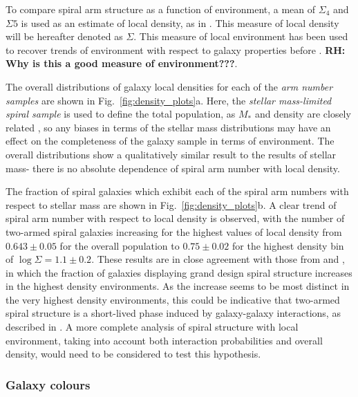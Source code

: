 \documentclass[useAMS,usenatbib]{mn2e}
\newcommand{\rh}[1]{{\bf \textcolor{RoyalPurple}{RH: #1}}}
\begin{document}
To compare spiral arm structure as a function of environment, a mean of $\Sigma_4$ and $\Sigma5$ is used as an estimate of local density, as in \citealt{Baldry_06}. This measure of local density will be hereafter denoted as $\Sigma$. This measure of local environment has been used to recover trends of environment with respect to galaxy properties before \citep{Baldry_06,Bamford_09}. \rh{Why is this a good measure of environment???}.

The overall distributions of galaxy local densities for each of the \textit{arm number samples} are shown in Fig.~\ref{fig:density_plots}a. Here, the \textit{stellar mass-limited spiral sample} is used to define the total population, as $M_*$ and density are closely related \citep{Baldry_06}, so any biases in terms of the stellar mass distributions may have an effect on the completeness of the galaxy sample in terms of environment. The overall distributions show a qualitatively similar result to the results of stellar mass- there is no absolute dependence of spiral arm number with local density. 

The fraction of spiral galaxies which exhibit each of the spiral arm numbers with respect to stellar mass are shown in Fig.~\ref{fig:density_plots}b. A clear trend of spiral arm number with respect to local density is observed, with the number of two-armed spiral galaxies increasing for the highest values of local density from $0.643 \pm 0.05$ for the overall population to $0.75 \pm 0.02$ for the highest density bin of $\log \Sigma = 1.1 \pm 0.2$. These results are in close agreement with those from \citealt{EE_82} and \citealt{Ann_14}, in which the fraction of galaxies displaying grand design spiral structure increases in the highest density environments. As the increase seems to be most distinct in the very highest density environments, this could be indicative that two-armed spiral structure is a  short-lived phase induced by galaxy-galaxy interactions, as described in \citealt{EE_86}. A more complete analysis of spiral structure with local environment, taking into account both interaction probabilities and overall density, would need to be considered to test this hypothesis.


\subsubsection{Galaxy colours}
\label{sec:colours}
\end{document}
